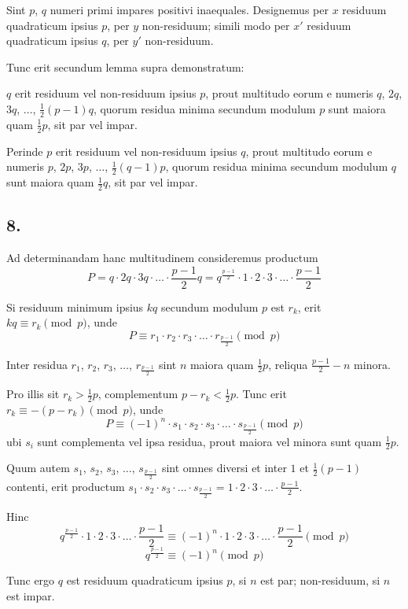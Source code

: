 \documentclass[12pt,a4paper]{article}
\theoremstyle{plain}
\theoremstyle{definition}
\theoremstyle{remark}
\begin{document}
Sint $p$, $q$ numeri primi impares positivi inaequales. Designemus per $x$ residuum quadraticum ipsius $p$, per $y$ non-residuum; simili modo per $x'$ residuum quadraticum ipsius $q$, per $y'$ non-residuum.

Tunc erit secundum lemma supra demonstratum:

$q$ erit residuum vel non-residuum ipsius $p$, prout multitudo eorum e numeris $q$, $2q$, $3q$, $\ldots$, $\frac{1}{2}(p-1)q$, quorum residua minima secundum modulum $p$ sunt maiora quam $\frac{1}{2}p$, sit par vel impar.

Perinde $p$ erit residuum vel non-residuum ipsius $q$, prout multitudo eorum e numeris $p$, $2p$, $3p$, $\ldots$, $\frac{1}{2}(q-1)p$, quorum residua minima secundum modulum $q$ sunt maiora quam $\frac{1}{2}q$, sit par vel impar.

\subsection*{8.}
Ad determinandam hanc multitudinem consideremus productum
\[P = q \cdot 2q \cdot 3q \cdot \ldots \cdot \frac{p-1}{2}q = q^{\frac{p-1}{2}} \cdot 1 \cdot 2 \cdot 3 \cdot \ldots \cdot \frac{p-1}{2}\]

Si residuum minimum ipsius $kq$ secundum modulum $p$ est $r_k$, erit $kq \equiv r_k \pmod{p}$, unde
\[P \equiv r_1 \cdot r_2 \cdot r_3 \cdot \ldots \cdot r_{\frac{p-1}{2}} \pmod{p}\]

Inter residua $r_1$, $r_2$, $r_3$, $\ldots$, $r_{\frac{p-1}{2}}$ sint $n$ maiora quam $\frac{1}{2}p$, reliqua $\frac{p-1}{2}-n$ minora.

Pro illis sit $r_k > \frac{1}{2}p$, complementum $p-r_k < \frac{1}{2}p$. Tunc erit $r_k \equiv -(p-r_k) \pmod{p}$, unde
\[P \equiv (-1)^n \cdot s_1 \cdot s_2 \cdot s_3 \cdot \ldots \cdot s_{\frac{p-1}{2}} \pmod{p}\]
ubi $s_i$ sunt complementa vel ipsa residua, prout maiora vel minora sunt quam $\frac{1}{2}p$.

Quum autem $s_1$, $s_2$, $s_3$, $\ldots$, $s_{\frac{p-1}{2}}$ sint omnes diversi et inter $1$ et $\frac{1}{2}(p-1)$ contenti, erit productum $s_1 \cdot s_2 \cdot s_3 \cdot \ldots \cdot s_{\frac{p-1}{2}} = 1 \cdot 2 \cdot 3 \cdot \ldots \cdot \frac{p-1}{2}$.

Hinc
\[q^{\frac{p-1}{2}} \cdot 1 \cdot 2 \cdot 3 \cdot \ldots \cdot \frac{p-1}{2} \equiv (-1)^n \cdot 1 \cdot 2 \cdot 3 \cdot \ldots \cdot \frac{p-1}{2} \pmod{p}\]
\[q^{\frac{p-1}{2}} \equiv (-1)^n \pmod{p}\]

Tunc ergo $q$ est residuum quadraticum ipsius $p$, si $n$ est par; non-residuum, si $n$ est impar.
\end{document}
